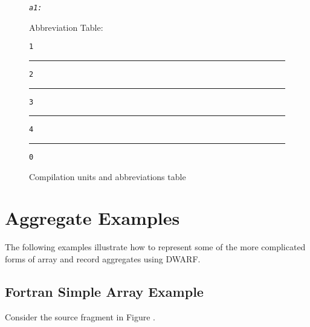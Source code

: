 \begin{figure}[here]
\begin{minipage}[t]{0.03\linewidth}
\begin{alltt}
\textit{a1:}
\end{alltt}
\end{minipage}
%
\begin{minipage}[t]{0.41\linewidth}
\centering
Abbreviation Table: \dotdebugabbrev{}
\begin{framed}
\scriptsize
\begin{alltt}\vspace{0.06cm}
1
\DWTAGcompileunit
\DWCHILDRENyes
\DWATname       \DWFORMstring
\DWATproducer   \DWFORMstring
\DWATcompdir   \DWFORMstring
\DWATlanguage   \DWFORMdataone
\DWATlowpc     \DWFORMaddr
\DWAThighpc    \DWFORMdataone
\DWATstmtlist  {}
\vspace{0.01cm}
\hrule
2
\DWTAGbasetype
\DWCHILDRENno
\DWATname       \DWFORMstring
\DWATencoding   \DWFORMdataone
\DWATbytesize  {}
\vspace{0.01cm}
\hrule
3
\DWTAGpointertype
\DWCHILDRENno
\DWATtype       {}
\vspace{0.01cm}
\hrule
4
\DWTAGtypedef
\DWCHILDRENno
\DWATname      \DWFORMstring
\DWATtype      {}
\vspace{0.01cm}
\hrule
0
\end{alltt}
\end{framed}
\end{minipage}

\vspace{0.2cm}
\caption{Compilation units and abbreviations table} \label{fig:compilationunitsandabbreviationstable}
\end{figure}

\clearpage

\section{Aggregate Examples}
\label{app:aggregateexamples}

The following examples illustrate how to represent some of
the more complicated forms of array and record aggregates
using DWARF.

\subsection{Fortran Simple Array Example}
\label{app:fortranarrayexample}
Consider the  source fragment in 
Figure .

